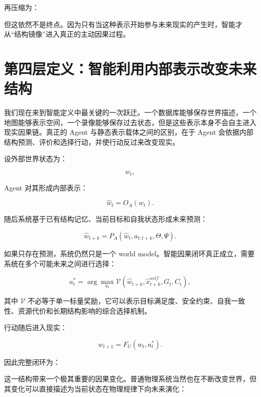 再压缩为：

\begin{statementbox}
\centering
{}
\end{statementbox}

但这依然不是终点。因为只有当这种表示开始参与未来现实的产生时，智能才从“结构镜像”进入真正的主动因果过程。

\section{第四层定义：智能利用内部表示改变未来结构}

我们现在来到智能定义中最关键的一次跃迁。一个数据库能够保存世界描述，一个地图能够表示空间，一个录像能够保存过去状态，但是这些表示本身不会自主进入现实因果链。真正的 Agent 与静态表示载体之间的区别，在于 Agent 会依据内部结构预测、评价和选择行动，并使行动反过来改变现实。

设外部世界状态为：

\[
w_t,
\]

Agent 对其形成内部表示：

\[
\hat w_t
=
O_A(w_t).
\]

随后系统基于已有结构记忆、当前目标和自我状态形成未来预测：

\[
\hat w_{t+k}
=
P_A
\left(
\hat w_t,
a_{t:t+k},
\Theta,
\Psi
\right).
\]

如果只存在预测，系统仍然只是一个 world model。智能因果闭环真正成立，需要系统在多个可能未来之间进行选择：

\[
a_t^*
=
\arg\max_{a_t}
\mathcal V
\left(
\hat w_{t+k},
\hat x_{t+k}^{self},
G_t,
C_t
\right),
\]

其中 \(\mathcal V\) 不必等于单一标量奖励，它可以表示目标满足度、安全约束、自我一致性、资源代价和长期结构影响的综合选择机制。

行动随后进入现实：

\[
w_{t+1}
=
F_U(w_t,a_t^*).
\]

因此完整闭环为：

\begin{statementbox}
\centering
{}
\end{statementbox}

这一结构带来一个极其重要的因果变化。普通物理系统当然也在不断改变世界，但其变化可以直接描述为当前状态在物理规律下向未来演化：

